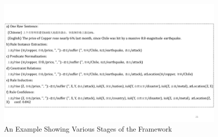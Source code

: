 
\begin{figure}[htbp]
	\centering
	\includegraphics[width=0.99\linewidth]{figures/pipeline_example}
	\caption{An Example Showing Various Stages of the Framework}
	\label{fig:stages_in_an_example}
\end{figure}

